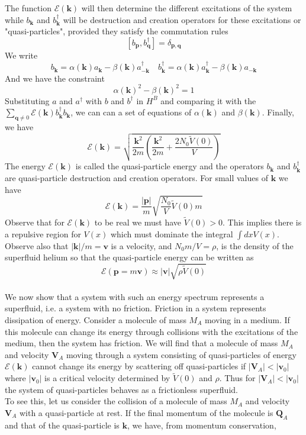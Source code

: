 \documentclass[cyan]{elegantnote}
\begin{document}
The function $\mathcal{E}(\bm{k})$  will then determine the different excitations of the system while $b_{\bm{k}}$ and $b^{\dagger}_{\bm{k}}$ will be destruction and creation operators for these excitations or "quasi-particles", provided they satisfy the commutation rules
\[[b_{\bm{p}},b_{\bm{q}}^{\dagger}] = \delta_{\bm{p},\bm{q}}\]
We write
\[b_{\bm{k}} = \alpha(\bm{k})a_{\bm{k}} - \beta(\bm{k})a^{\dagger}_{-\bm{k}} \quad b^{\dagger}_{\bm{k}} = \alpha(\bm{k})a^{\dagger}_{\bm{k}} - \beta(\bm{k})a_{-\bm{k}} \]
And we have the constraint
\[\alpha(\bm{k})^2 - \beta(\bm{k})^2 = 1\]
Substituting $a$ and $a^{\dagger}$ with $b$ and $b^{\dagger}$ in $H^B$ and comparing it with the $\sum_{\bm{q} \neq 0} \mathcal{E}(\bm{k})b^{\dagger}_{\bm{k}} b_{\bm{k}}$, we can can a set of equations of $\alpha(\bm{k})$ and $\beta(\bm{k})$. Finally, we have
\[\mathcal{E}(\bm{k}) = \sqrt{\frac{\bm{k}^2}{2m} \left(\frac{\bm{k}^2}{2m} + \frac{2N_0\tilde{V}(0)}{V} \right) }\]
The energy $\mathcal{E}(\bm{k})$ is called the quasi-particle energy and the operators $b_{\bm{k}}$ and $b^{\dagger}_{\bm{k}}$ are quasi-particle destruction and creation operators. 
For small values of $\bm{k}$ we have
\[\mathcal{E}(\bm{k}) = \frac{|\bm{p}|}{m} \sqrt{\frac{N_0}{V}\tilde{V}(0)m}\]
Observe that for $\mathcal{E}(\bm{k})$ to be real we must have $\tilde{V}(0) > 0$. This implies there is a repulsive region for $V(x)$ which must dominate the integral $\int dx V(x)$. Observe also that $|\bm{k}|/m = \bm{v}$ is a velocity, and $N_0m/V = \rho$, is the density of the superfluid helium so that the quasi-particle energy can be written as 
\[\mathcal{E}(\bm{p} = m\bm{v}) \approx |\bm{v}|\sqrt{\rho\tilde{V}(0)}\]
\\
We now show that a system with such an energy spectrum represents a superfluid, i.e. a system with no friction.
Friction in a system represents dissipation of energy.
Consider a molecule of mass $M_A$ moving in a medium. If this molecule can change its energy through collisions with the excitations of the medium, then the system has friction. 
We will find that a molecule of mass $M_A$ and velocity $\bm{V}_A$ moving through a system consisting of quasi-particles of energy $\mathcal{E}(\bm{k})$ cannot change its energy by scattering off quasi-particles if $|\bm{V}_A| < |\bm{v}_0|$ where $|\bm{v}_0|$ is a critical velocity determined by $\tilde{V}(0)$ and $\rho$. 
Thus for $|\bm{V}_A| < |\bm{v}_0|$ the system of quasi-particles behaves as a frictionless superfluid.
\\
To see this, let us consider the collision of a molecule of mass $M_A$ and velocity $\bm{V}_A$ with a quasi-particle at rest. If the final momentum of the molecule is $\bm{Q}_A$ and that of the quasi-particle is $\bm{k}$, we have, from momentum conservation,
\end{document}

